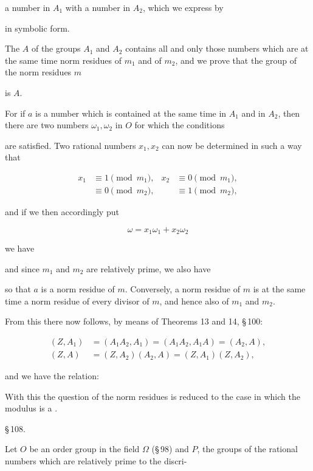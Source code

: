 a number in $A_1$ with a number in $A_2$, which we express by


in symbolic form.

The  $A$ of the groups $A_1$ and $A_2$ contains all and only those numbers which are at the same time norm residues of $m_1$ and of $m_2$, and we prove that the group of the norm residues $m$


is $A$.

For if $a$ is a number which is contained at the same time in $A_1$ and in $A_2$, then there are two numbers $\omega_1, \omega_2$ in $O$ for which the conditions


are satisfied. Two rational numbers $x_1, x_2$ can now be determined in such a way that

\[
\begin{aligned}
x_1 &\equiv 1 \pmod{m_1}, & x_2 &\equiv 0 \pmod{m_1},\\
&\equiv 0 \pmod{m_2}, & &\equiv 1 \pmod{m_2},
\end{aligned}
\]

and if we then accordingly put

\[ \omega = x_1 \omega_1 + x_2 \omega_2 \]

we have


and since $m_1$ and $m_2$ are relatively prime, we also have


so that $a$ is a norm residue of $m$. Conversely, a norm residue of $m$ is at the same time a norm residue of every divisor of $m$, and hence also of $m_1$ and $m_2$.

From this there now follows, by means of Theorems 13 and 14, \S\,100:

\[
\begin{aligned}
(Z, A_1) &= (A_1 A_2, A_1) = (A_1 A_2, A_1 A) = (A_2, A),\\
(Z, A) &= (Z, A_2)(A_2, A) = (Z, A_1)(Z, A_2),
\end{aligned}
\]

and we have the relation:


With this the question of the norm residues is reduced to the case in which the modulus is a .

\S\,108. 

Let $O$ be an order group in the field $\Omega$ (\S\,98) and $P$, the groups of the rational numbers which are relatively prime to the discri-
